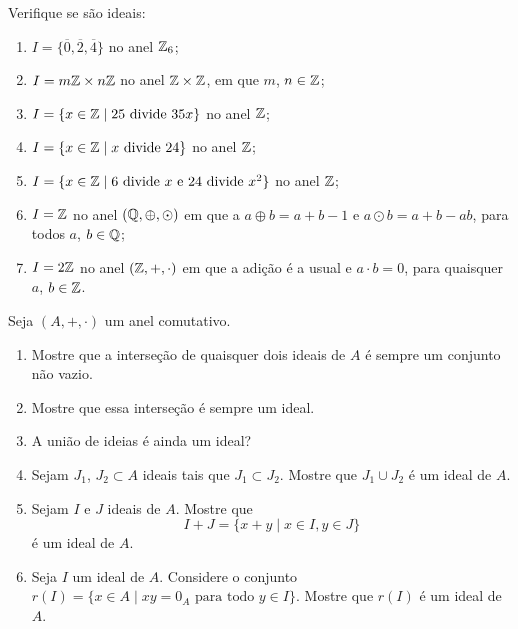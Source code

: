 \documentclass[12pt]{exam}
\begin{document}
\questao{} Verifique se são ideais:
\begin{enumerate}[label=({\alph*})]
    \item  $I = \{\overline{0}, \overline{2}, \overline{4}\}$ no anel $\mathbb{Z}_6$;

    \item $I = m\mathbb{Z} \times n\mathbb{Z}$ no anel $\mathbb{Z} \times \mathbb{Z}$, em que $m$, $n \in \mathbb{Z}$;

    \item $I = \{x \in \mathbb{Z} \mid 25 \mbox{ divide } 35x\}$ no anel $\mathbb{Z}$;

    \item $I = \{x \in \mathbb{Z} \mid x \mbox{ divide } 24\}$ no anel $\mathbb{Z}$;

    \item $I = \{x \in \mathbb{Z} \mid 6 \mbox{ divide } x \mbox{ e } 24 \mbox{ divide } x^2\}$ no anel $\mathbb{Z}$;

    \item $I = \mathbb{Z}$ no anel $(\mathbb{Q}, \oplus, \odot)$ em que a $a \oplus b = a + b - 1$ e $a \odot b = a + b - ab$, para todos $a$, $b \in \mathbb{Q}$;

    \item $I = 2\mathbb{Z}$ no anel $(\mathbb{Z}, +, \cdot)$ em que a adição é a usual e $a \cdot b = 0$, para quaisquer $a$, $b \in \mathbb{Z}$.
\end{enumerate}

\vspace{.3cm}

\questao{} Seja $(A, +, \cdot)$ um anel comutativo.
\begin{enumerate}[label=({\alph*})]
    \item Mostre que a interseção de quaisquer dois ideais de $A$ é sempre um conjunto não vazio.

    \item Mostre que essa interseção é sempre um ideal.

    \item A união de ideias é ainda um ideal?

    \item Sejam $J_1$, $J_2 \subset A$ ideais tais que $J_1 \subset J_2$. Mostre que $J_1 \cup J_2$ é um ideal de $A$.

    \item Sejam $I$ e $J$ ideais de $A$. Mostre que
    \[
    I + J = \{x + y \mid x \in I, y \in J\}
    \]
    é um ideal de $A$.

    \item Seja $I$ um ideal de $A$. Considere o conjunto $r(I) = \{x \in A \mid xy = 0_A \mbox{ para todo } y \in I\}$. Mostre que
    $r(I)$ é um ideal de $A$.
\end{enumerate}
\end{document}
